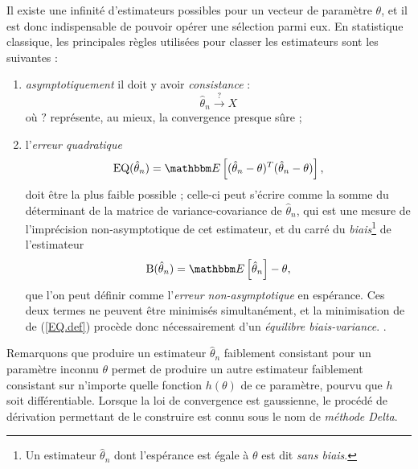 Il existe une infinit\'e d'estimateurs possibles pour un vecteur de param\`etre $\theta$, et il est donc indispensable de pouvoir op\'erer une s\'election parmi eux. En statistique classique, %
les principales r\`egles utilis\'ees pour classer les estimateurs sont les suivantes :
\begin{enumerate}
\item {\it asymptotiquement} il doit y avoir {\it consistance} :
$$
\hat\theta_n \xrightarrow{?} X
$$
o\`u $?$ repr\'esente, au mieux, la convergence presque s\^ure ;
\item l'{\it erreur quadratique} 
 
\begin{eqnarray}
\mbox{EQ}(\hat{\theta}_n) = \E\left[(\hat{\theta}_n-\theta)^T (\hat{\theta}_n-\theta)\right], \label{EQ.def}
\end{eqnarray}
doit \^etre la plus faible possible ; celle-ci peut s'\'ecrire comme la somme du d\'eterminant de la matrice de variance-covariance  de $\hat{\theta}_n$, qui est une mesure de l'impr\'ecision non-asymptotique de cet estimateur, et du carr\'e du {\it biais}\footnote{Un estimateur $\hat{\theta}_n$  dont l'esp\'erance est \'egale \`a $\theta$ est dit {\it sans biais}.} de l'estimateur 
$$
\mbox{B}(\hat{\theta}_n) = \E\left[\hat{\theta}_n\right] - \theta,
$$
que l'on peut d\'efinir comme l'{\it erreur non-asymptotique} en esp\'erance. Ces deux termes ne peuvent \^etre minimis\'es simultan\'ement, et la minimisation de de (\ref{EQ.def}) proc\`ede donc n\'ecessairement d'un {\it \'equilibre biais-variance}. . 
%
\end{enumerate}
Remarquons que produire un estimateur $\hat\theta_n$ faiblement consistant  pour un param\`etre inconnu $\theta$ permet de produire un autre estimateur faiblement consistant sur n'importe quelle fonction $h(\theta)$ de ce param\`etre, pourvu que $h$ soit diff\'erentiable. Lorsque la loi de convergence est gaussienne, le proc\'ed\'e de d\'erivation permettant de le cons\-truire est connu sous le nom de {\it m\'ethode Delta}. \\ %

